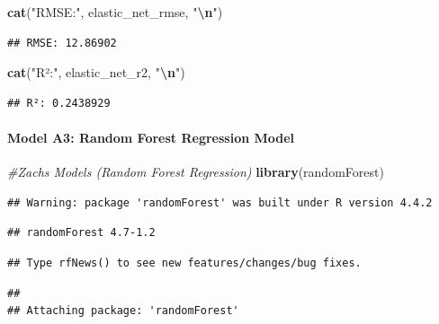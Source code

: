 \documentclass[
]{article}
\newenvironment{Shaded}{\begin{snugshade}}{\end{snugshade}}
\newcommand{\CommentTok}[1]{\textcolor[rgb]{0.56,0.35,0.01}{\textit{#1}}}
\newcommand{\FunctionTok}[1]{\textcolor[rgb]{0.13,0.29,0.53}{\textbf{#1}}}
\newcommand{\NormalTok}[1]{#1}
\newcommand{\SpecialCharTok}[1]{\textcolor[rgb]{0.81,0.36,0.00}{\textbf{#1}}}
\newcommand{\StringTok}[1]{\textcolor[rgb]{0.31,0.60,0.02}{#1}}
\begin{document}
\begin{Shaded}
\begin{Highlighting}[]
\FunctionTok{cat}\NormalTok{(}\StringTok{"RMSE:"}\NormalTok{, elastic\_net\_rmse, }\StringTok{"}\SpecialCharTok{\textbackslash{}n}\StringTok{"}\NormalTok{)}
\end{Highlighting}
\end{Shaded}

\begin{verbatim}
## RMSE: 12.86902
\end{verbatim}

\begin{Shaded}
\begin{Highlighting}[]
\FunctionTok{cat}\NormalTok{(}\StringTok{"R²:"}\NormalTok{, elastic\_net\_r2, }\StringTok{"}\SpecialCharTok{\textbackslash{}n}\StringTok{"}\NormalTok{)}
\end{Highlighting}
\end{Shaded}

\begin{verbatim}
## R²: 0.2438929
\end{verbatim}

\paragraph{Model A3: Random Forest Regression
Model}\label{model-a3-random-forest-regression-model}

\begin{Shaded}
\begin{Highlighting}[]
\CommentTok{\#Zachs Models (Random Forest Regression)}
\FunctionTok{library}\NormalTok{(randomForest)}
\end{Highlighting}
\end{Shaded}

\begin{verbatim}
## Warning: package 'randomForest' was built under R version 4.4.2
\end{verbatim}

\begin{verbatim}
## randomForest 4.7-1.2
\end{verbatim}

\begin{verbatim}
## Type rfNews() to see new features/changes/bug fixes.
\end{verbatim}

\begin{verbatim}
## 
## Attaching package: 'randomForest'
\end{verbatim}
\end{document}

